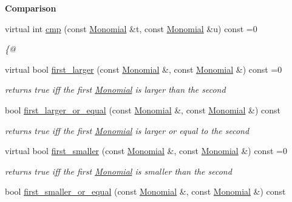 \begin{Indent}\textbf{ Comparison}\par
\begin{DoxyCompactItemize}
\item 
virtual int \hyperlink{class_monomial___ordering_a9bc3155fc98b4d40c26118fa2114b827}{cmp} (const \hyperlink{class_monomial}{Monomial} \&t, const \hyperlink{class_monomial}{Monomial} \&u) const =0
\begin{DoxyCompactList}\small\item\em \{@ \end{DoxyCompactList}\item 
\mbox{\label{class_monomial___ordering_aed41fe82e1ca5cd287a93d287fee7c20}} 
virtual bool \hyperlink{class_monomial___ordering_aed41fe82e1ca5cd287a93d287fee7c20}{first\+\_\+larger} (const \hyperlink{class_monomial}{Monomial} \&, const \hyperlink{class_monomial}{Monomial} \&) const =0
\begin{DoxyCompactList}\small\item\em returns {\ttfamily true} iff the first \hyperlink{class_monomial}{Monomial} is larger than the second \end{DoxyCompactList}\item 
bool \hyperlink{class_monomial___ordering_afbae8e00a02ce0334bb0376cf0f0db75}{first\+\_\+larger\+\_\+or\+\_\+equal} (const \hyperlink{class_monomial}{Monomial} \&, const \hyperlink{class_monomial}{Monomial} \&) const
\begin{DoxyCompactList}\small\item\em returns {\ttfamily true} iff the first \hyperlink{class_monomial}{Monomial} is larger or equal to the second \end{DoxyCompactList}\item 
virtual bool \hyperlink{class_monomial___ordering_ab6c02638f87382f7a9a95b994e9a5dfb}{first\+\_\+smaller} (const \hyperlink{class_monomial}{Monomial} \&, const \hyperlink{class_monomial}{Monomial} \&) const =0
\begin{DoxyCompactList}\small\item\em returns {\ttfamily true} iff the first \hyperlink{class_monomial}{Monomial} is smaller than the second \end{DoxyCompactList}\item 
bool \hyperlink{class_monomial___ordering_ac9234fccc26cca2aee57e28af7b61880}{first\+\_\+smaller\+\_\+or\+\_\+equal} (const \hyperlink{class_monomial}{Monomial} \&, const \hyperlink{class_monomial}{Monomial} \&) const

\end{DoxyCompactItemize}
\end{Indent}
